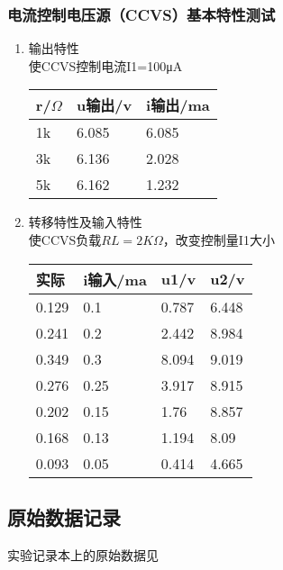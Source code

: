 \documentclass[dvipsnames, svgnames,a4paper,11pt]{article}
\begin{document}
					\subsubsection{电流控制电压源（CCVS）基本特性测试}
				\begin{enumerate}
					
					\item 输出特性\\
					使CCVS控制电流I1=100μA 
				\begin{table}[htbp]
					\centering
					\begin{tabular}{|l|l|l|}
						\hline
						r/$\Omega $ & u输出/v & i输出/ma  \\ \hline
						1k & 6.085 & 6.085  \\ \hline
						3k & 6.136 & 2.028  \\ \hline
						5k & 6.162 & 1.232  \\ \hline
					\end{tabular}
				\end{table}
				\item 转移特性及输入特性\\
				使CCVS负载$RL=2K\Omega $，改变控制量I1大小
				\begin{table}[htbp]
					\centering
					\begin{tabular}{|l|l|l|l|}
						\hline
						实际 & i输入/ma & u1/v & u2/v  \\ \hline
						0.129 & 0.1 & 0.787 & 6.448  \\ \hline
						0.241 & 0.2 & 2.442 & 8.984  \\ \hline
						0.349 & 0.3 & 8.094 & 9.019  \\ \hline
						0.276 & 0.25 & 3.917 & 8.915  \\ \hline
						0.202 & 0.15 & 1.76 & 8.857  \\ \hline
						0.168 & 0.13 & 1.194 & 8.09  \\ \hline
						0.093 & 0.05 & 0.414 & 4.665  \\ \hline
					\end{tabular}
				\end{table}
			
         	\end{enumerate}
	
	
	\clearpage
	\subsection{原始数据记录}
	实验记录本上的原始数据见%
	
\end{document}
